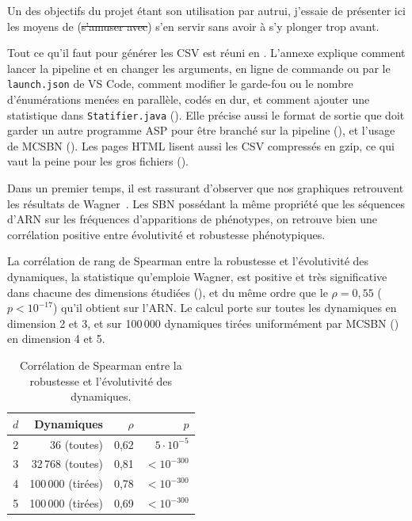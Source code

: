 \documentclass[12pt, a4paper]{article}
\begin{document}
Un des objectifs du projet étant son utilisation par autrui, j'essaie de présenter ici les moyens de (\sout{s'amuser avec}) s'en servir sans avoir à s'y plonger trop avant. 

Tout ce qu'il faut pour générer les CSV est réuni en .
L'annexe explique comment lancer la pipeline et en changer les arguments, en ligne de commande ou par le \texttt{launch.json} de VS Code, comment modifier le garde-fou ou le nombre d'énumérations menées en parallèle, codés en dur, et comment ajouter une statistique dans \texttt{Statifier.java} ().
Elle précise aussi le format de sortie que doit garder un autre programme ASP pour être branché sur la pipeline (), et l'usage de MCSBN ().
Les pages HTML lisent aussi les CSV compressés en gzip, ce qui vaut la peine pour les gros fichiers ().


Dans un premier temps, il est rassurant d'observer que nos graphiques retrouvent les résultats de Wagner~\cite{wagner2008}. Les SBN possédant la même propriété que les séquences d'ARN sur les fréquences d'apparitions de phénotypes, on retrouve bien une corrélation positive entre évolutivité et robustesse phénotypiques. 

La corrélation de rang de Spearman entre la robustesse et l'évolutivité des dynamiques, la statistique qu'emploie Wagner, est positive et très significative dans chacune des dimensions étudiées (), et du même ordre que le $\rho = 0{,}55$ ($p < 10^{-17}$) qu'il obtient sur l'ARN.
Le calcul porte sur toutes les dynamiques en dimension 2 et 3, et sur 100\,000 dynamiques tirées uniformément par MCSBN () en dimension 4 et 5.

\begin{table}[H]
\centering
\small
\caption{Corrélation de Spearman entre la robustesse et l'évolutivité des dynamiques.}
\label{tab:spearman}
\begin{tabular}{rrrr}
\toprule
$d$ & Dynamiques & $\rho$ & $p$ \\
\midrule
2 & 36 (toutes) & 0,62 & $5 \cdot 10^{-5}$ \\
3 & 32\,768 (toutes) & 0,81 & $< 10^{-300}$ \\
4 & 100\,000 (tirées) & 0,78 & $< 10^{-300}$ \\
5 & 100\,000 (tirées) & 0,69 & $< 10^{-300}$ \\
\bottomrule
\end{tabular}
\end{table}
\end{document}
